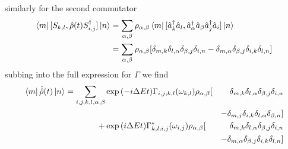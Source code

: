 similarly for the second commutator
\begin{align}
    \bra{m}[S_{k, l},
    \hat{\rho}(t)S^\dagger_{i, j}] \ket{n} & =
    \sum_{\alpha, \beta} \rho_{\alpha, \beta}\bra{m}
    [\hat{a}^\dagger_k \hat{a}_l
        ,\hat{a}^\dagger_\alpha \hat{a}_\beta
        \hat{a}^\dagger_j \hat{a}_i]
    \ket{n}                                    \\
                                           & =
    \sum_{\alpha, \beta} \rho_{\alpha, \beta} [
        \delta_{m, k}\delta_{l, \alpha}
        \delta_{\beta, j}\delta_{i, n}
        -\delta_{m, \alpha}\delta_{\beta, j}
        \delta_{i, k}\delta_{l, n}]
\end{align}
subbing into the full expression for
\(\Gamma \) we find
\begin{align}
    \bra{m}\dot{\hat{\rho}}(t) \ket{n} = \begin{aligned}[t]
        \sum_{i,j,k, l, \alpha, \beta} &
        \exp{(-i\Delta{}Et)}
        \Gamma_{i,j;k, l}(\omega_{k,l})
        \rho_{\alpha, \beta} [         &
            \delta_{m, k}\delta_{l, \alpha}
        \delta_{\beta, j}\delta_{i, n}                          \\
                                       &                      &
            -\delta_{m, j}\delta_{i, k}
        \delta_{l, \alpha}\delta_{\beta, n}]                    \\
        +                              & \exp{(i\Delta{}E t)}
        \Gamma^*_{k, l; i,j}(\omega_{i,j})
        \rho_{\alpha, \beta} [         &
            \delta_{m, k}\delta_{l, \alpha}
        \delta_{\beta, j}\delta_{i, n}                          \\
                                       &                      &
            - \delta_{m, \alpha}\delta_{\beta, j}
            \delta_{i, k}\delta_{l, n}]
    \end{aligned}
\end{align}

